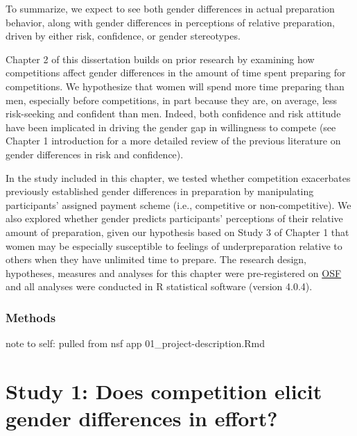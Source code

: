 \documentclass[a4paper, nobind]{templates/ociamthesis}
\begin{document}
To summarize, we expect to see both gender differences in actual preparation behavior, along with gender differences in perceptions of relative preparation, driven by either risk, confidence, or gender stereotypes.

Chapter 2 of this dissertation builds on prior research by examining how competitions affect gender differences in the amount of time spent preparing for competitions. We hypothesize that women will spend more time preparing than men, especially before competitions, in part because they are, on average, less risk-seeking \autocite{Croson2009,Dohmen2011b,Eckel2008,Bertrand2010a} and confident \autocite{Bertrand2010,Lundeberg1994,Mobius2011,Barber2001,Croson2009} than men. Indeed, both confidence and risk attitude have been implicated in driving the gender gap in willingness to compete \autocite{Niederle2011,Veldhuizen2017} (see Chapter 1 introduction for a more detailed review of the previous literature on gender differences in risk and confidence).

In the study included in this chapter, we tested whether competition exacerbates previously established gender differences in preparation by manipulating participants' assigned payment scheme (i.e., competitive or non-competitive). We also explored whether gender predicts participants' perceptions of their relative amount of preparation, given our hypothesis based on Study 3 of Chapter 1 that women may be especially susceptible to feelings of underpreparation relative to others when they have unlimited time to prepare. The research design, hypotheses, measures and analyses for this chapter were pre-registered on \href{https://osf.io/8bwfz/}{OSF} and all analyses were conducted in R statistical software (version 4.0.4).

\hypertarget{methods-3}{%
\subsection{Methods}\label{methods-3}}

note to self: pulled from nsf app 01\_project-description.Rmd

\hypertarget{study-1-does-competition-elicit-gender-differences-in-effort}{%
\chapter{Study 1: Does competition elicit gender differences in effort?}\label{study-1-does-competition-elicit-gender-differences-in-effort}}
\end{document}

